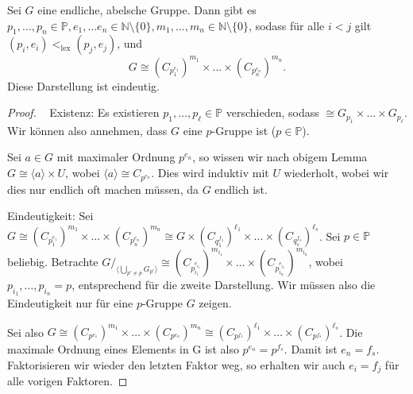 \begin{theorem}
    Sei $G$ eine endliche, abelsche Gruppe. Dann gibt es $p_1, \hdots, p_n \in \mathbb{P}, e_1, \hdots e_n \in \mathbb{N} \setminus \{0\}, m_1, \hdots, m_n \in \mathbb{N} \setminus \{0\}$, sodass für alle $i < j$ gilt $(p_i, e_i) <_{\text{lex}} (p_j, e_j)$, und
    $$ G \cong \left( C_{p_1^{e_1}} \right)^{m_1} \times \hdots \times \left( C_{p_n^{e_n}} \right)^{m_n}. $$
    Diese Darstellung ist eindeutig.
\end{theorem}

\begin{proof}{\ }
    Existenz: Es existieren $p_1, \hdots, p_\ell \in \mathbb{P}$ verschieden, sodass $\cong G_{p_1} \times \hdots \times G_{p_\ell}$. Wir können also \obda annehmen, dass $G$ eine $p$-Gruppe ist ($p \in \mathbb{P}$).

    Sei $a \in G$ mit maximaler Ordnung $p^{e_n}$, so wissen wir nach obigem Lemma $G \cong \langle a \rangle \times U$, wobei $\langle a \rangle \cong C_{p^{e_n}}$. Dies wird induktiv mit $U$ wiederholt, wobei wir dies nur endlich oft machen müssen, da $G$ endlich ist.

    Eindeutigkeit: Sei $ G \cong \left( C_{p_1^{e_1}} \right)^{m_1} \times \hdots \times \left( C_{p_n^{e_n}} \right)^{m_n} \cong G \times \left( C_{q_1^{f_1}} \right)^{\ell_1} \times \hdots \times \left( C_{q_s^{f_s}} \right)^{\ell_s} $. Sei $p \in \mathbb{P}$ beliebig. Betrachte $G /_{\langle \bigcup_{p' \neq p} G_{p'} \rangle} \cong \left( C_{p_{i_1}^{e_{i_1}}} \right)^{m_{i_1}} \times \hdots \times \left( C_{p_{i_n}^{e_{i_n}}} \right)^{m_{i_n}}$, wobei $p_{i_1}, \hdots, p_{i_n} = p$, entsprechend für die zweite Darstellung. Wir müssen also \obda die Eindeutigkeit nur für eine $p$-Gruppe $G$ zeigen.

    Sei also $G \cong (C_{p^{e_1}})^{m_1} \times \hdots \times (C_{p^{e_n}})^{m_n} \cong (C_{p^{f_1}})^{\ell_1} \times \hdots \times (C_{p^{f_s}})^{\ell_s}$. Die maximale Ordnung eines Elements in G ist also $p^{e_n} = p^{f_s}$. Damit ist $e_n = f_s$. Faktorisieren wir wieder den letzten Faktor weg, so erhalten wir auch $e_i = f_j$ für alle vorigen Faktoren.
\end{proof}